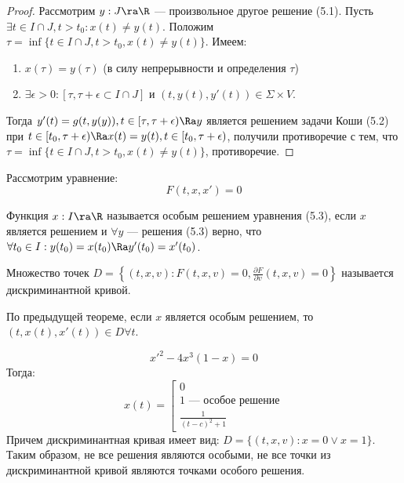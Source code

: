 \begin{proof}
    Рассмотрим \(y: J \ra \R\) --- произвольное другое решение (5.1). Пусть \(\exists t \in I \cap J, t > t_0: x(t) \ne y(t)\). Положим \(\tau = \inf\{t \in I \cap J, t > t_0, x(t) \ne y(t)\}\). Имеем:
    \begin{enumerate}
        \item \(x(\tau) = y(\tau)\) (в силу непрерывности и определения \(\tau\))
        \item \(\exists \epsilon > 0: [\tau, \tau + \epsilon \subset I \cap J]\) и \((t, y(t), y'(t)) \in \Sigma \times V\).
    \end{enumerate}
    Тогда \(y'(t) = g(t, y(y)), t \in [\tau, \tau + \epsilon) \Ra y\) является решением задачи Коши (5.2) при \(t \in [t_0, \tau + \epsilon) \Ra x(t) = y(t), t \in [t_0, \tau + \epsilon)\), получили противоречие с тем, что \(\tau = \inf\{t \in I \cap J, t > t_0, x(t) \ne y(t)\}\), противоречие.
\end{proof}

Рассмотрим уравнение:
\begin{equation}
    F(t, x, x') = 0
\end{equation}

\begin{definition}
    Функция \(x: I \ra \R\) называется особым решением уравнения (5.3), если \(x\) является решением и \(\forall y\) --- решения (5.3) верно, что \(\forall t_0 \in I: y(t_0) = x(t_0) \Ra y'(t_0) = x'(t_0)\).
\end{definition}

\begin{definition}
    Множество точек \(D = \left\{(t, x, v): F(t, x, v) = 0, \frac{\partial F}{\partial v}(t, x, v) = 0\right\}\) называется дискриминантной кривой.
\end{definition}

\begin{note}
    По предыдущей теореме, если \(x\) является особым решением, то \((t, x(t), x'(t)) \in D \forall t\).
\end{note}

\begin{example}
    \[x'^2 - 4x^3(1 - x) = 0\]
    Тогда:
    \[x(t) = \left[\begin{array}{l}
        0 \\
        1 \text{ --- особое решение}\\
        \frac{1}{(t - c)^2 + 1}
    \end{array}\right.\]
    Причем дискриминантная кривая имеет вид: \(D = \{(t, x, v): x = 0 \vee x = 1\}\). Таким образом, не все решения являются особыми, не все точки из дискриминантной кривой являются точками особого решения.
\end{example}

